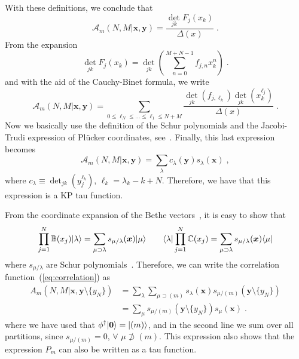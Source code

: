\documentclass[a4paper,11pt]{amsart}
\begin{document}
With these definitions, we conclude that
\begin{equation}
\mathcal{A}_m(N,M|\bm{x}, \bm{y}) =\frac{\det_{jk} F_j(x_k)}{\Delta(x)}\; .
\end{equation}
From the expansion 
\begin{equation}
  \det_{jk} F_j(x_k) = \det_{jk} \left(  \sum_{n=0}^{M + N -1} f_{j, n} x_k^n \right) \; .
\end{equation}
and with the aid of the Cauchy-Binet formula, we write  
\begin{equation}
    \mathcal{A}_m(N,M|\bm{x}, \bm{y})
  = \sum_{0\leq \ell_N\leq \dots \leq \ell_1 \leq N+M}
  \frac{\det_{jk}(f_{j, \ell_k}) \det_{jk}(x_k^{\ell_j})}{\Delta(x)}\; . 
\end{equation}
Now we basically use the definition of the Schur polynomials and the
Jacobi-Trudi expression of Plücker coordinates, see~\cite{Alexandrov:2012tr}. 
Finally, this last expression becomes
\begin{equation}
\mathcal{A}_m(N,M|\bm{x}, \bm{y}) =
\sum_{\lambda} c_\lambda(\bm{y}) s_\lambda(\bm{x}) \; ,
\end{equation}
where \(c_\lambda \equiv \det_{jk}(y_j^{\ell_k})\),  \(\ell_k = \lambda_k - k +N\). Therefore,
we have that this expression is a KP tau function. 

From the coordinate expansion of the Bethe
vectors~\cite{Bogoliubov2005, Tsilevich:2006}, it is easy to show that
\begin{equation}
\prod_{j=1}^N \mathbb{B}(x_j)\lvert\lambda\rangle  = \sum_{\mu \supset \lambda } s_{\mu/\lambda}(\bm{x})\lvert\mu\rangle\qquad 
 \langle\lambda\rvert \prod_{j=1}^N \mathbb{C}(x_j) = \sum_{\mu \supset \lambda } s_{\mu/\lambda}(\bm{x})\langle\mu\rvert
\end{equation}
where \(s_{\mu/\lambda}\) are Schur polynomials~\cite{Macdonald:1998}.
Therefore, we can write the correlation function~(\ref{eq:correlation}) as 
\begin{equation}
\begin{split}
  A_m(N, M|\bm{x}, \bm{y}\setminus \{y_N\})
  & = \sum_\lambda \sum_{\mu \supset (m)} s_{\lambda}(\bm{x}) s_{\mu/(m)}(\bm{y}\setminus\{y_N\})\\
  & = \sum_\mu s_{\mu/(m)}(\bm{y}\setminus\{y_N\}) s_{\mu}(\bm{x})\; .
\end{split}
\end{equation}
where we have used that \(\phi^\dagger \lvert\bm{0}\rangle = \lvert(m)\rangle\), and in the second line
we sum over all partitions, since \(s_{\mu/(m)} = 0\), \(\forall \) \(\mu \not \supset (m)\).
This expression also shows that the expression \(P_m\) can also be written as a tau function. 
\end{document}
